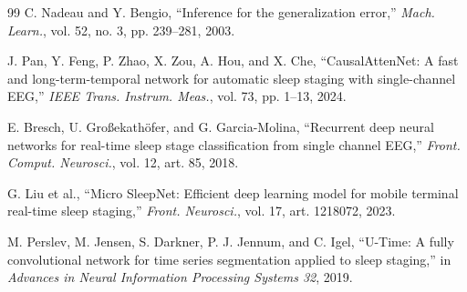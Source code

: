 \documentclass[conference]{IEEEtran}
\begin{document}
\begin{thebibliography}{99}
 C. Nadeau and Y. Bengio, ``Inference for the generalization error,'' \emph{Mach.
Learn.}, vol. 52, no. 3, pp. 239--281, 2003.

 J. Pan, Y. Feng, P. Zhao, X. Zou, A. Hou, and X. Che, ``CausalAttenNet: A
fast and long-term-temporal network for automatic sleep staging with single-channel EEG,''
\emph{IEEE Trans. Instrum. Meas.}, vol. 73, pp. 1--13, 2024.

 E. Bresch, U. Gro\ss{}ekath\"ofer, and G. Garcia-Molina, ``Recurrent deep neural
networks for real-time sleep stage classification from single channel EEG,'' \emph{Front. Comput.
Neurosci.}, vol. 12, art. 85, 2018.

 G. Liu et al., ``Micro SleepNet: Efficient deep learning model for mobile
terminal real-time sleep staging,'' \emph{Front. Neurosci.}, vol. 17, art. 1218072, 2023.

 M. Perslev, M. Jensen, S. Darkner, P. J. Jennum, and C. Igel, ``U-Time: A fully
convolutional network for time series segmentation applied to sleep staging,'' in \emph{Advances in
Neural Information Processing Systems 32}, 2019.

\end{thebibliography}
\end{document}
